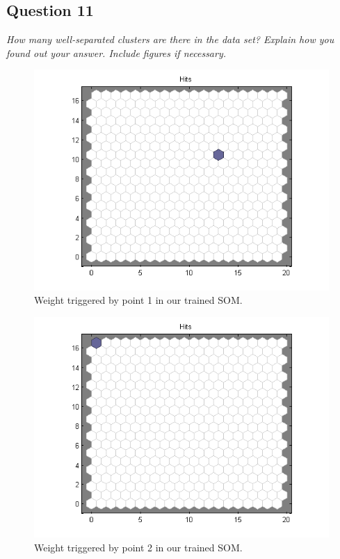 \documentclass[a4paper]{article}
\begin{document}
\subsection*{Question 11}
\emph{How many well-separated clusters are there in the data set?
Explain how you found out your answer. Include figures if necessary.}

 \begin{figure}[H] %
	 \includegraphics[]{point1.png}
	 \caption{\label{fig:point1} Weight triggered by point 1 in our trained SOM.}
 \end{figure}
 \begin{figure}[H] %
	 \includegraphics[]{point2.png}
	 \caption{\label{fig:point2} Weight triggered by point 2 in our trained SOM.}
 \end{figure}
\end{document}
